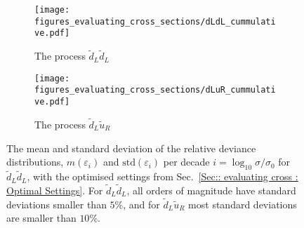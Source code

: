 \documentclass[twoside,english]{uiofysmaster}
\begin{document}
{{\begin{figure}
    \centering
    \begin{subfigure}[b]{0.8\textwidth}
        \texttt{[image: figures\_evaluating\_cross\_sections/dLdL\_cummulative.pdf]}
        \caption{The process $\widetilde{d}_L \widetilde{d}_L$}
        \label{Fig:: evaluating cross : RD cummulative dLdL}
    \end{subfigure}
    \begin{subfigure}[b]{0.8\textwidth}
        \texttt{[image: figures\_evaluating\_cross\_sections/dLuR\_cummulative.pdf]}
        \caption{The process $\widetilde{d}_L \widetilde{u}_R$}
        \label{Fig:: evaluating cross : RD cummulative dLuR}
    \end{subfigure}
    \caption{The mean and standard deviation of the relative deviance distributions, $m(\varepsilon_i)$ and $\mathrm{std}(\varepsilon_i)$ per decade $i = \log_{10} \sigma/\sigma_0$ for $\widetilde{d}_L \widetilde{d}_L$, with the optimised settings from Sec.~\ref{Sec:: evaluating cross : Optimal Settings}. For $\widetilde{d}_L \widetilde{d}_L$, all orders of magnitude have standard deviations smaller than $5\%$, and for $\widetilde{d}_L \widetilde{u}_R$ most standard deviations are smaller than $10\%$.}
\label{Fig:: evaluating cross : RD cummulative dLdL dLuR}
\end{figure}




}}
\end{document}
